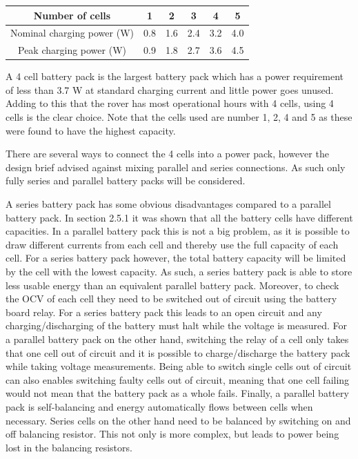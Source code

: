 \documentclass[a4paper]{article}
\begin{document}
\begin{center}
    \begin{tabular}{||c| c c c c c||} 
    \hline
    Number of cells& 1 & 2 & 3 & 4 & 5 \\ [0.5ex] 
    \hline
    Nominal charging power (W) & 0.8 & 1.6 & 2.4 & 3.2 & 4.0\\ [1ex] 
    \hline
    Peak charging power (W) & 0.9 & 1.8 & 2.7 & 3.6 & 4.5 \\ [1ex] 
    \hline
    \end{tabular}
\end{center}


A 4 cell battery pack is the largest battery pack which has a power 
requirement of less than 3.7 W at standard charging current and little 
power goes unused. Adding to this that the rover has most operational 
hours with 4 cells, using 4 cells is the clear choice. Note that the 
cells used are number 1, 2, 4 and 5 as these were found to have the 
highest capacity.

There are several ways to connect the 4 cells into a power pack, 
however the design brief advised against mixing parallel and series 
connections\cite{energyBrief}. As such only fully series and parallel 
battery packs will be considered. 

A series battery pack has some obvious disadvantages compared to 
a parallel battery pack. In section 2.5.1 it was shown that all the 
battery cells have different capacities. In a parallel battery pack 
this is not a big problem, as it is possible to draw different currents 
from each cell and thereby use the full capacity of each cell. For a 
series battery pack however, the total battery capacity will be limited 
by the cell with the lowest capacity. As such, a series battery pack 
is able to store less usable energy than an equivalent parallel battery 
pack. Moreover, to check the OCV of each cell they need to be switched 
out of circuit using the battery board relay. For a series battery pack 
this leads to an open circuit and any charging/discharging of the battery 
must halt while the voltage is measured. For a parallel battery pack on the 
other hand, switching the relay of a cell only takes that one cell out of 
circuit and it is possible to charge/discharge the battery pack while 
taking voltage measurements. Being able to switch single cells out of 
circuit can also enables switching faulty cells out of circuit, meaning 
that one cell failing would not mean that the battery pack as a whole fails. 
Finally, a parallel battery pack is self-balancing and energy automatically
flows between cells when necessary\cite{batteryBalancing}. Series cells on the 
other hand need to be balanced by switching on and off balancing resistor. 
This not only is more complex, but leads to power being lost in the balancing
resistors.
\end{document}
